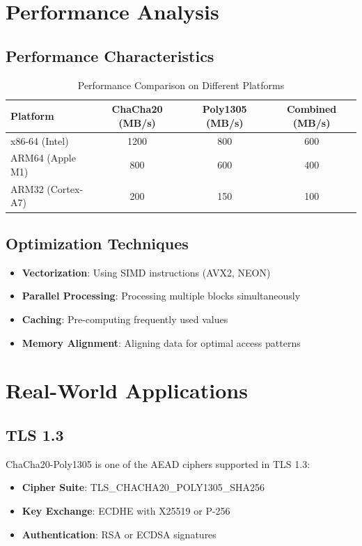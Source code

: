 \documentclass[11pt,a4paper]{article}
\begin{document}
\section{Performance Analysis}

\subsection{Performance Characteristics}

\begin{table}[h]
\centering
\begin{tabular}{|l|c|c|c|}
\hline
\textbf{Platform} & \textbf{ChaCha20 (MB/s)} & \textbf{Poly1305 (MB/s)} & \textbf{Combined (MB/s)} \\
\hline
x86-64 (Intel) & 1200 & 800 & 600 \\
ARM64 (Apple M1) & 800 & 600 & 400 \\
ARM32 (Cortex-A7) & 200 & 150 & 100 \\
\hline
\end{tabular}
\caption{Performance Comparison on Different Platforms}
\end{table}

\subsection{Optimization Techniques}

\begin{itemize}
    \item \textbf{Vectorization}: Using SIMD instructions (AVX2, NEON)
    \item \textbf{Parallel Processing}: Processing multiple blocks simultaneously
    \item \textbf{Caching}: Pre-computing frequently used values
    \item \textbf{Memory Alignment}: Aligning data for optimal access patterns
\end{itemize}

\section{Real-World Applications}

\subsection{TLS 1.3}

ChaCha20-Poly1305 is one of the AEAD ciphers supported in TLS 1.3:
\begin{itemize}
    \item \textbf{Cipher Suite}: TLS\_CHACHA20\_POLY1305\_SHA256
    \item \textbf{Key Exchange}: ECDHE with X25519 or P-256
    \item \textbf{Authentication}: RSA or ECDSA signatures
\end{itemize}
\end{document}
